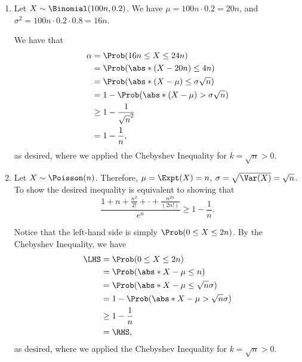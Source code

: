\Question{\currfilebase}

\begin{enumerate}
    \item Let \(X \sim \Binomial(100n, 0.2)\). We have \(\mu = 100n \cdot 0.2 = 20n\), and \(\sigma^2 = 100n \cdot 0.2 \cdot 0.8 = 16n\).

          We have that
          \begin{align*}
              \alpha & = \Prob(16n \leq X \leq 24n)                   \\
                     & = \Prob(\abs*{(X - 20n)} \leq 4n)              \\
                     & = \Prob(\abs*{(X - \mu)} \leq \sigma \sqrt n)  \\
                     & = 1 - \Prob(\abs*{(X - \mu)} > \sigma \sqrt n) \\
                     & \geq 1 - \frac{1}{\sqrt{n}^2}                  \\
                     & = 1 - \frac{1}{n},
          \end{align*}
          as desired, where we applied the Chebyshev Inequality for \(k = \sqrt{n} > 0\).

    \item Let \(X \sim \Poisson(n)\). Therefore, \(\mu = \Expt(X) = n\), \(\sigma = \sqrt{\Var(X)} = \sqrt{n}\). To show the desired inequality is equivalent to showing that
          \[
              \frac{1 + n + \frac{n^2}{2!} + \cdot + \frac{n^{2n}}{(2n!)}}{e^n} \geq 1 - \frac{1}{n}.
          \]

          Notice that the left-hand side is simply \(\Prob(0 \leq X \leq 2n)\). By the Chebyshev Inequality, we have
          \begin{align*}
              \LHS & = \Prob(0 \leq X \leq 2n)                     \\
                   & = \Prob(\abs*{X - \mu} \leq n)                \\
                   & = \Prob(\abs*{X - \mu} \leq \sqrt{n} \sigma)  \\
                   & = 1 - \Prob(\abs*{X - \mu} > \sqrt{n} \sigma) \\
                   & \geq 1 - \frac{1}{n}                          \\
                   & = \RHS,
          \end{align*}
          as desired, where we applied the Chebyshev Inequality for \(k = \sqrt{n} > 0\).
\end{enumerate}